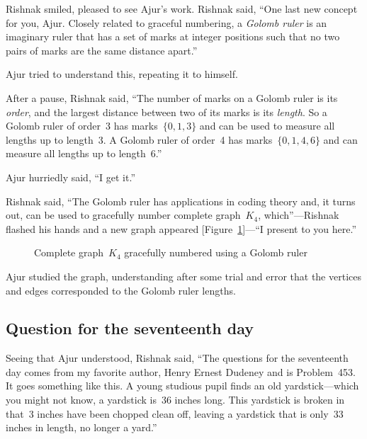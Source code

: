 Rishnak smiled, pleased to see Ajur's work. Rishnak said, ``One last new concept for you, Ajur. Closely related to graceful numbering, a \textit{Golomb ruler} is an imaginary ruler that has a set of marks at integer positions such that no two pairs of marks are the same distance apart.''

Ajur tried to understand this, repeating it to himself.

After a pause, Rishnak said, ``The number of marks on a Golomb ruler is its \textit{order}, and the largest distance between two of its marks is its \textit{length}. So a Golomb ruler of order~3 has marks~$\{0,1,3\}$ and can be used to measure all lengths up to length~3. A Golomb ruler of order~4 has marks~$\{0,1,4,6\}$ and can measure all lengths up to length~6.''

Ajur hurriedly said, ``I get it.''

Rishnak said, ``The Golomb ruler has applications in coding theory and, it turns out, can be used to gracefully number complete graph~$K_4$, which''---Rishnak flashed his hands and a new graph appeared [Figure~\ref{19g5}]---``I present to you here.''

\begin{figure}
\begin{center}


\caption{Complete graph~$K_4$ gracefully numbered using a Golomb ruler}\label{19g5}
\end{center}
\end{figure}

Ajur studied the graph, understanding after some trial and error that the vertices and edges corresponded to the Golomb ruler lengths.

\subsection*{Question for the seventeenth day}
Seeing that Ajur understood, Rishnak said, ``The questions for the seventeenth day comes from my favorite author, Henry Ernest Dudeney and is Problem~453. It goes something like this. A young studious pupil finds an old yardstick---which you might not know, a yardstick is~36 inches long.
This yardstick is broken in that~3 inches have been chopped clean off, leaving a yardstick that is only~33 inches in length, no longer a yard.''

